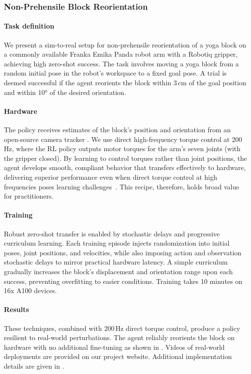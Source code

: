 \subsubsection{Non-Prehensile Block Reorientation}

\paragraph{Task definition}
We present a sim-to-real setup for non-prehensile reorientation of a yoga block on a commonly available Franka Emika Panda robot arm with a Robotiq gripper, achieving high zero-shot success. The task involves moving a yoga block from a random initial pose in the robot’s workspace to a fixed goal pose. A trial is deemed successful if the agent reorients the block within 3\,cm of the goal position and within 10° of the desired orientation.

\paragraph{Hardware}
The policy receives estimates of the block’s position and orientation from an open-source camera tracker \citep{artrackalvar}. We use direct high-frequency torque control at 200\,Hz, where the RL policy outputs motor torques for the arm’s seven joints (with the gripper closed). By learning to control torques rather than joint positions, the agent develops smooth, compliant behavior that transfers effectively to hardware, delivering superior performance even when direct torque control at high frequencies poses learning challenges~\citep{holt2024evolving}. This recipe, therefore, holds broad value for practitioners.

\paragraph{Training}
Robust zero-shot transfer is enabled by stochastic delays and progressive curriculum learning. Each training episode injects randomization into initial poses, joint positions, and velocities, while also imposing action and observation stochastic delays to mirror practical hardware latency. A simple curriculum gradually increases the block’s displacement and orientation range upon each success, preventing overfitting to easier conditions. Training takes 10 minutes on 16x A100 devices.

\paragraph{Results}
These techniques, combined with 200\,Hz direct torque control, produce a policy resilient to real-world perturbations. The agent reliably reorients the block on hardware with no additional fine-tuning as shown in . Videos of real-world deployments are provided on our project website. Additional implementation details are given in .

